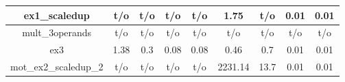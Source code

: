 \begin{table}[t]
\begin{tabular}{|c|c|c|c|c|c|c|c|c|}
ex1\_scaledup         & t/o       & t/o          & t/o        & t/o                  & 1.75      & t/o          & 0.01       & 0.01                 \\ \hline
mult\_3operands       & t/o       & t/o          & t/o        & t/o                  & t/o       & t/o          & t/o        & t/o                  \\ \hline
ex3                   & 1.38      & 0.3          & 0.08       & 0.08                 & 0.46      & 0.7          & 0.01       & 0.01                 \\ \hline
mot\_ex2\_scaledup\_2 & t/o       & t/o          & t/o        & t/o                  & 2231.14   & 13.7         & 0.01       & 0.01                 \\ \hline
\end{tabular}
\end{table} 
